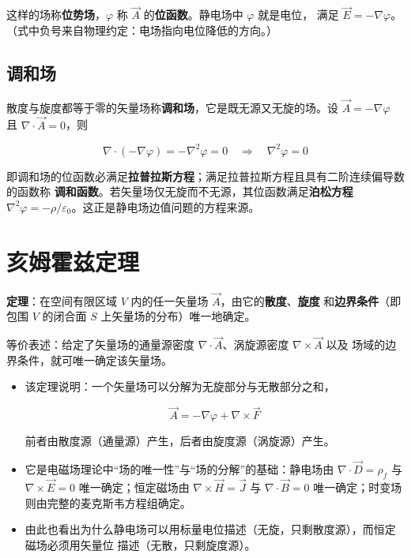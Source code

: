 这样的场称\textbf{位势场}，$\varphi$ 称 $\vec{A}$ 的\textbf{位函数}。静电场中 $\varphi$ 就是电位，
满足 $\vec{E}=-\nabla\varphi$。（式中负号来自物理约定：电场指向电位降低的方向。）

\subsection{调和场}

散度与旋度都等于零的矢量场称\textbf{调和场}，它是既无源又无旋的场。设 $\vec{A}=-\nabla\varphi$
且 $\nabla\cdot\vec{A}=0$，则
\begin{formulaBox}
\[
\nabla\cdot(-\nabla\varphi)=-\nabla^2\varphi=0
\quad\Longrightarrow\quad
\nabla^2\varphi=0
\]
\end{formulaBox}

即调和场的位函数必满足\textbf{拉普拉斯方程}；满足拉普拉斯方程且具有二阶连续偏导数的函数称
\textbf{调和函数}。若矢量场仅无旋而不无源，其位函数满足\textbf{泊松方程}
$\nabla^2\varphi=-\rho/\varepsilon_0$。这正是静电场边值问题的方程来源。

\section{亥姆霍兹定理}

\textbf{定理}：在空间有限区域 $V$ 内的任一矢量场 $\vec{A}$，由它的\textbf{散度}、\textbf{旋度}
和\textbf{边界条件}（即包围 $V$ 的闭合面 $S$ 上矢量场的分布）唯一地确定。

等价表述：给定了矢量场的通量源密度 $\nabla\cdot\vec{A}$、涡旋源密度 $\nabla\times\vec{A}$ 以及
场域的边界条件，就可唯一确定该矢量场。

\begin{itemize}
    \item 该定理说明：一个矢量场可以分解为无旋部分与无散部分之和，
    \begin{formulaBox}
    \[
    \vec{A}=-\nabla\varphi+\nabla\times\vec{F}
    \]
    \end{formulaBox}
    前者由散度源（通量源）产生，后者由旋度源（涡旋源）产生。
    \item 它是电磁场理论中“场的唯一性”与“场的分解”的基础：静电场由 $\nabla\cdot\vec{D}=\rho_f$
    与 $\nabla\times\vec{E}=0$ 唯一确定；恒定磁场由 $\nabla\times\vec{H}=\vec{J}$ 与
    $\nabla\cdot\vec{B}=0$ 唯一确定；时变场则由完整的麦克斯韦方程组确定。
    \item 由此也看出为什么静电场可以用标量电位描述（无旋，只剩散度源），而恒定磁场必须用矢量位
    描述（无散，只剩旋度源）。
\end{itemize}

